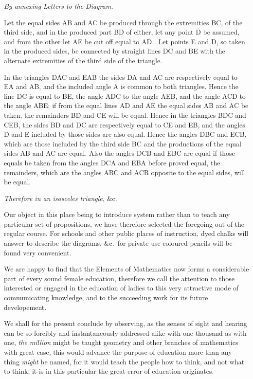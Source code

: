 \documentclass{byrne-book}
\begin{document}
\qedNB

\begin{center}
\emph{By annexing Letters to the Diagram.}
\end{center}

Let the equal sides AB and AC be produced through the extremities BC, of the third side, and in the produced part BD of either, let any point D be assumed, and from the other let AE be cut off equal to AD . Let points E and D, so taken in the produced sides, be connected by straight lines DC and BE with the alternate extremities of the third side of the triangle.

In the triangles DAC and EAB the sides DA and AC are respectively equal to EA and AB, and the included angle A is common to both triangles. Hence  the line DC is equal to BE, the angle ADC to the angle AEB, and the angle ACD to the angle ABE; if from the equal lines AD and AE the equal sides AB and AC be taken, the remainders BD and CE will be equal. Hence in the triangles BDC and CEB, the sides BD and DC are respectively equal to CE and EB, and the angles D and E included by those sides are also equal. Hence  the angles DBC and ECB, which are those included by the third side BC and the productions of the equal sides AB and AC are equal. Also the angles DCB and EBC are equal if those equals be taken from the angles DCA and EBA before proved equal, the remainders, which are the angles ABC and ACB opposite to the equal sides, will be equal.

\emph{Therefore in an isosceles triangle,} \&c.

\qedNB

Our object in this place being to introduce system rather than to teach any particular set of propositions, we have therefore selected the foregoing out of the regular course. For schools and other public places of instruction, dyed chalks will answer to describe the diagrams, \&c.\ for private use coloured pencils will be found very convenient.

We are happy to find that the Elements of Mathematics now forms a considerable part of every sound female education, therefore we call the attention to those interested or engaged in the education of ladies to this very attractive mode of communicating knowledge, and to the succeeding work for its future developement.

We shall for the present conclude by observing, as the senses of sight and hearing can be so forcibly and instantaneously addressed alike with one thousand as with one, \emph{the million} might be taught geometry and other branches of mathematics with great ease, this would advance the purpose of education more than any thing \emph{might} be named, for it would teach the people how to think, and not what to think; it is in this particular the great error of education originates.
\end{document}
